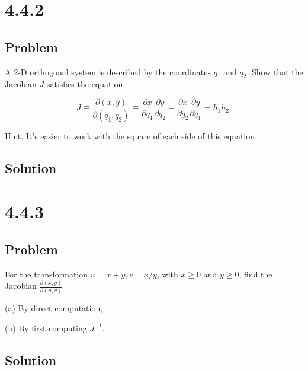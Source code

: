 \documentclass[12pt]{article}
\begin{document}
\newpage
\section{4.4.2}

\subsection{Problem}

A 2-D orthogonal system is described by the coordinates \(q_{1}\) and \(q_{2}\). Show that the Jacobian \(J\) satisfies the equation

\[
    J \equiv \frac{\partial(x, y)}{\partial\left(q_{1}, q_{2}\right)} \equiv \frac{\partial x}{\partial q_{1}} \frac{\partial y}{\partial q_{2}}-\frac{\partial x}{\partial q_{2}} \frac{\partial y}{\partial q_{1}}=h_{1} h_{2} .
\]

Hint. It's easier to work with the square of each side of this equation.

\subsection{Solution}

\newpage
\section{4.4.3}

\subsection{Problem}

For the transformation \(u=x+y, v=x / y\), with \(x \geq 0\) and \(y \geq 0\), find the Jacobian \(\frac{\partial(x, y)}{\partial(u, v)}\)

(a) By direct computation,

(b) By first computing \(J^{-1}\).

\subsection{Solution}

\newpage


\nocite{arfken2013mathematical}
\nocite{El-Deeb_PEU-356_Assignments}
\end{document}
